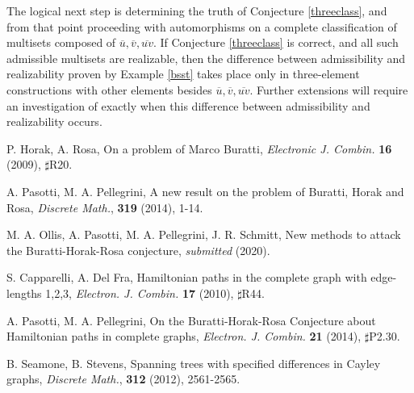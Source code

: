\documentclass[12pt]{article}
\newcommand{\ol}[1]{\overline{#1}} %
\begin{document}
The logical next step is determining the truth of Conjecture \ref{threeclass}, and from that point
proceeding with automorphisms on a complete classification of multisets composed of
$\ol{u}, \ol{v}, \ol{uv}$. If Conjecture \ref{threeclass} is correct, and all such admissible
multisets are realizable, then the difference between admissibility and realizability proven by
Example \ref{bsst} takes place only in three-element constructions with other elements besides
$\ol{u}, \ol{v}, \ol{uv}$. Further extensions will require an investigation of exactly when this difference
between admissibility and realizability occurs.
\pagebreak

\begin{thebibliography}{6}

  P. Horak, A. Rosa,
  On a problem of Marco Buratti,
  \textit{Electronic J. Combin.} \textbf{16} (2009), $\sharp$R20.

  A. Pasotti, M. A. Pellegrini,
  A new result on the problem of Buratti, Horak and Rosa,
  \textit{Discrete Math.}, \textbf{319} (2014), 1-14. 

  M. A. Ollis, A. Pasotti, M. A. Pellegrini, J. R. Schmitt,
  New methods to attack the Buratti-Horak-Rosa conjecture,
  \textit{submitted} (2020).

  S. Capparelli, A. Del Fra,
  Hamiltonian paths in the complete graph with edge-lengths 1,2,3,
  \textit{Electron. J. Combin.} \textbf{17} (2010), $\sharp$R44.

  A. Pasotti, M. A. Pellegrini,
  On the Buratti-Horak-Rosa Conjecture about Hamiltonian paths in complete graphs,
  \textit{Electron. J. Combin.} \textbf{21} (2014), $\sharp$P2.30.

  B. Seamone, B. Stevens,
  Spanning trees with specified differences in Cayley graphs,
  \textit{Discrete Math.}, \textbf{312} (2012), 2561-2565.

\end{thebibliography}
\end{document}
